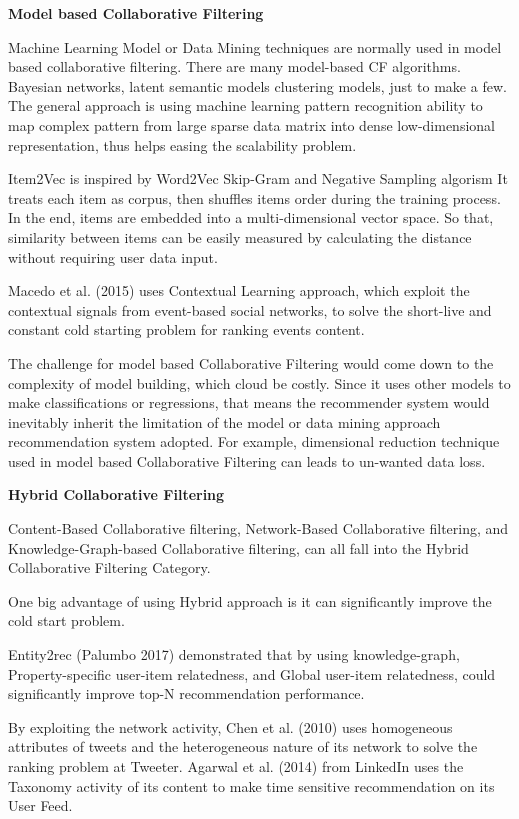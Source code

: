 \bigskip
\textbf{Model based Collaborative Filtering}

Machine Learning Model or Data Mining techniques are normally used in model based collaborative filtering. There are many model-based CF algorithms. Bayesian networks, latent semantic models clustering models, just to make a few. The general approach is using machine learning pattern recognition ability to map complex pattern from large sparse data matrix into dense low-dimensional representation, thus helps easing the scalability problem.  

Item2Vec \citep{barkan2016item2vec} is inspired by Word2Vec \citep{mikolov2013distributed} Skip-Gram and Negative Sampling algorism It treats each item as corpus, then shuffles items order during the training process. In the end, items are embedded into a multi-dimensional vector space. So that, similarity between items can be easily measured by calculating the distance without requiring user data input.  

Macedo et al. (2015) uses Contextual Learning approach, which exploit the contextual signals from event-based social networks, to solve the short-live and constant cold starting problem for ranking events content. 

The challenge for model based Collaborative Filtering would come down to the complexity of model building, which cloud be costly.  Since it uses other models to make classifications or regressions, that means the recommender system would inevitably inherit the limitation of the model or data mining approach recommendation system adopted. For example, dimensional reduction technique used in model based Collaborative Filtering can leads to un-wanted data loss. 
 

\bigskip
\textbf{Hybrid Collaborative Filtering}

Content-Based Collaborative filtering, Network-Based Collaborative filtering, and Knowledge-Graph-based Collaborative filtering, can all fall into the Hybrid Collaborative Filtering Category.  

One big advantage of using Hybrid approach is it can significantly improve the cold start problem.  

Entity2rec (Palumbo 2017) demonstrated that by using knowledge-graph, Property-specific user-item relatedness, and Global user-item relatedness, could significantly improve top-N recommendation performance. 

By exploiting the network activity, Chen et al. (2010) uses homogeneous attributes of tweets and the heterogeneous nature of its network to solve the ranking problem at Tweeter. Agarwal et al. (2014) from LinkedIn uses the Taxonomy activity of its content to make time sensitive recommendation on its User Feed. 

